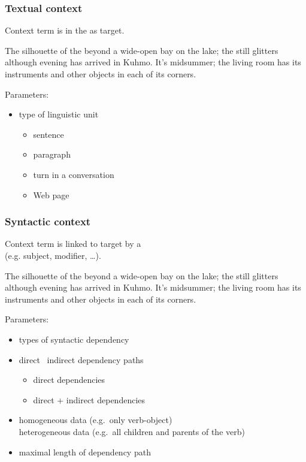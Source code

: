 \begin{frame}
  \frametitle{Textual context}
  
  \begin{center}
    Context term is in the  as target.
  \end{center}

  {\color{secondary}The silhouette of the} 
  {\color{secondary}beyond a wide-open bay on the lake; the}
   {\color{secondary}still glitters although evening has
    arrived in Kuhmo.} It's midsummer; the living room has its
  instruments and other objects in each of its corners.
  
  \gap
  Parameters:
  \begin{itemize}
  \item type of linguistic unit
    \begin{itemize}
    \item sentence
    \item paragraph
    \item turn in a conversation
    \item Web page
    \end{itemize}
  \end{itemize}
\end{frame}

\begin{frame}
  \frametitle{Syntactic context}
  
  \ungap
  \begin{center}
    Context term is linked to target by a \\
    (e.g. subject, modifier, \ldots).
  \end{center}

  The {\color{secondary}silhouette} of the  beyond a
  wide-open {\color{secondary}bay} on the lake; the 
  still {\color{secondary}glitters} although evening has arrived in
  Kuhmo. It's midsummer; the living room has its instruments and other
  objects in each of its corners.
  
  \gap
  Parameters:
  \begin{itemize}
  \item types of syntactic dependency \citep{Pado:Lapata:07}
  \item direct \vs\ indirect dependency paths
    \begin{itemize}
    \item direct dependencies
    \item direct + indirect dependencies
    \end{itemize}
  \item homogeneous data (e.g.\ only verb-object) \vs\\
    heterogeneous data (e.g.\ all children and parents of the verb)
  \item maximal length of dependency path
  \end{itemize}
\end{frame}


